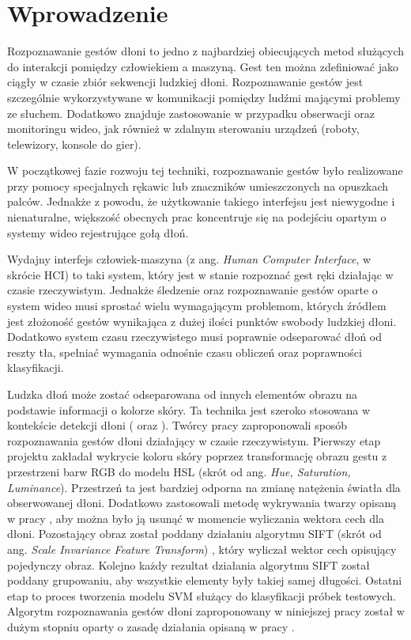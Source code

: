 \chapter{Wprowadzenie}
\label{cha:wprowadzenie}
Rozpoznawanie gestów dłoni to jedno z najbardziej obiecujących metod służących do interakcji pomiędzy człowiekiem a maszyną. Gest ten można zdefiniować jako ciągły w czasie zbiór sekwencji ludzkiej dłoni. Rozpoznawanie gestów jest szczególnie wykorzystywane w komunikacji pomiędzy ludźmi mającymi problemy ze słuchem. Dodatkowo znajduje zastosowanie w przypadku obserwacji oraz monitoringu wideo, jak również w zdalnym sterowaniu urządzeń (roboty, telewizory, konsole do gier). 

W początkowej fazie rozwoju tej techniki, rozpoznawanie gestów było realizowane przy pomocy specjalnych rękawic lub znaczników umieszczonych na opuszkach palców. Jednakże z powodu, że użytkowanie takiego interfejsu jest niewygodne i nienaturalne, większość obecnych prac koncentruje się na podejściu opartym o systemy wideo rejestrujące gołą dłoń.

Wydajny interfejs człowiek-maszyna (z ang. \textit{Human Computer Interface}, w skrócie HCI) to taki system, który jest w stanie rozpoznać gest ręki działając w czasie rzeczywistym. Jednakże śledzenie oraz rozpoznawanie gestów oparte o system wideo musi sprostać wielu wymagającym problemom, których źródłem jest złożoność gestów wynikająca z dużej ilości punktów swobody ludzkiej dłoni. Dodatkowo system czasu rzeczywistego musi poprawnie odseparować dłoń od reszty tła, spełniać wymagania odnośnie czasu obliczeń oraz poprawności klasyfikacji.

Ludzka dłoń może zostać odseparowana od innych elementów obrazu na podstawie informacji o kolorze skóry. Ta technika jest szeroko stosowana w kontekście detekcji dłoni (\cite{Temp1} oraz \cite{Temp2}). Twórcy pracy \cite{SiftBowSvm} zaproponowali sposób rozpoznawania gestów dłoni działający w czasie rzeczywistym. Pierwszy etap projektu zakładał wykrycie koloru skóry poprzez transformację obrazu gestu z przestrzeni barw RGB do modelu HSL (skrót od ang. \textit{Hue, Saturation, Luminance}). Przestrzeń ta jest bardziej odporna na zmianę natężenia światła dla obserwowanej dłoni. Dodatkowo zastosowali metodę wykrywania twarzy opisaną w pracy \cite{ViolaJonesRobustDetection}, aby można było ją usunąć w momencie wyliczania wektora cech dla dłoni. Pozostający obraz został poddany działaniu algorytmu SIFT (skrót od ang. \textit{Scale Invariance Feature Transform}) \cite{Sift}, który wyliczał wektor cech opisujący pojedynczy obraz. Kolejno każdy rezultat działania algorytmu SIFT został poddany grupowaniu, aby wszystkie elementy były takiej samej długości. Ostatni etap to proces tworzenia modelu SVM służący do klasyfikacji próbek testowych. Algorytm rozpoznawania gestów dłoni zaproponowany w niniejszej pracy został w dużym stopniu oparty o zasadę działania opisaną w pracy \cite{SiftBowSvm}.

